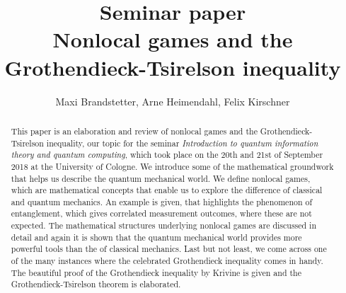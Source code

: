 

\title{Seminar paper \\ Nonlocal games and the Grothendieck-Tsirelson inequality}
\author{Maxi Brandstetter, Arne Heimendahl, Felix Kirschner}





\begin{abstract}
This paper is an elaboration and review of nonlocal games and the Grothendieck-Tsirelson inequality, our topic for the seminar \emph{Introduction to quantum information theory and quantum computing}, which took place on the 20th and 21st of September 2018 at the University of Cologne. We introduce some of the mathematical groundwork that helps us describe the quantum mechanical world. We define nonlocal games, which are mathematical concepts that enable us to explore the difference of classical and quantum mechanics. An example is given, that highlights the phenomenon of entanglement, which gives correlated measurement outcomes, where these are not expected. The mathematical structures underlying nonlocal games are discussed in detail and again it is shown that the quantum mechanical world provides more powerful tools than the of classical mechanics. Last but not least, we come across one of the many instances where the celebrated Grothendieck inequality comes in handy. The beautiful proof of the Grothendieck inequality by Krivine is given and the Grothendieck-Tsirelson theorem is elaborated. 
\end{abstract}


\maketitle	
\tableofcontents
	
	
\newpage	
{}



	\vspace{8pt}
%	


